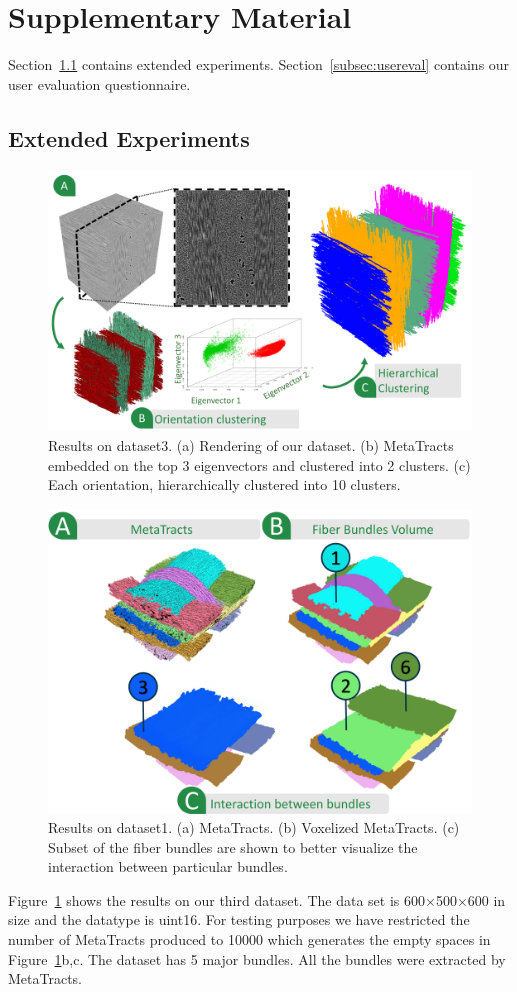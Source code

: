 \section{Supplementary Material}
\label{sec:sm}
Section~\ref{subsec:ext_exp} contains extended experiments.
Section~\ref{subsec:usereval} contains our user evaluation questionnaire.
\subsection{Extended Experiments}
\label{subsec:ext_exp}

\begin{figure}[h]
	\centering
	\includegraphics[width=0.7\linewidth]{images_pvis/dataset3.pdf}
	\caption{Results on dataset3. (a) Rendering of our dataset. (b) MetaTracts embedded on the top 3 eigenvectors and clustered into 2 clusters. (c) Each orientation, hierarchically clustered into 10 clusters.}
	\label{fig:dataset3}
\end{figure}
\begin{figure}[h]
	\centering
	\includegraphics[width=0.7\linewidth]{images_pvis/dataset1-extended.pdf}
	\caption{Results on dataset1. (a) MetaTracts. (b) Voxelized MetaTracts. (c) Subset of the fiber bundles are shown to better visualize the interaction between particular bundles.}
	\label{fig:dataset1-extended}
\end{figure}
Figure~\ref{fig:dataset3} shows the results on our third dataset. The data set is 600$\times$500$\times$600 in size and the datatype is uint16. For testing purposes we have restricted the number of MetaTracts produced to 10000 which generates the empty spaces in Figure~\ref{fig:dataset3}b,c.
The dataset has 5 major bundles. All the bundles were extracted by MetaTracts.

